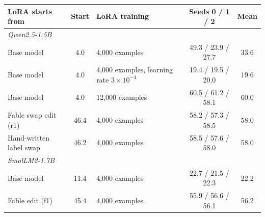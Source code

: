 \begin{tabular}{lclcc}
\toprule
LoRA starts from & Start & LoRA training & Seeds 0 / 1 / 2 & Mean \\
\midrule
\multicolumn{5}{l}{\textit{Qwen2.5-1.5B}} \\
\quad Base model & 4.0 & 4,000 examples & 49.3 / 23.9 / 27.7 & 33.6 \\
\quad Base model & 4.0 & 4,000 examples, learning rate $3\times10^{-4}$ & 19.4 / 19.5 / 20.0 & 19.6 \\
\quad Base model & 4.0 & 12,000 examples & 60.5 / 61.2 / 58.1 & 60.0 \\
\quad Fable swap edit (r1) & 46.4 & 4,000 examples & 58.2 / 57.3 / 58.5 & 58.0 \\
\quad Hand-written label swap & 46.2 & 4,000 examples & 58.5 / 57.6 / 58.0 & 58.0 \\
\multicolumn{5}{l}{\textit{SmolLM2-1.7B}} \\
\quad Base model & 11.4 & 4,000 examples & 22.7 / 21.5 / 22.3 & 22.2 \\
\quad Fable edit (f1) & 45.4 & 4,000 examples & 55.9 / 56.6 / 56.1 & 56.2 \\
\bottomrule
\end{tabular}
